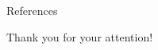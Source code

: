 \documentclass[10pt]{beamer}
\begin{document}
\begin{frame}[allowframebreaks]{References}	
	
	
\end{frame}

\begin{frame}
	 \centering
	{\Large Thank you for your attention!}
	
\end{frame}
\end{document}
